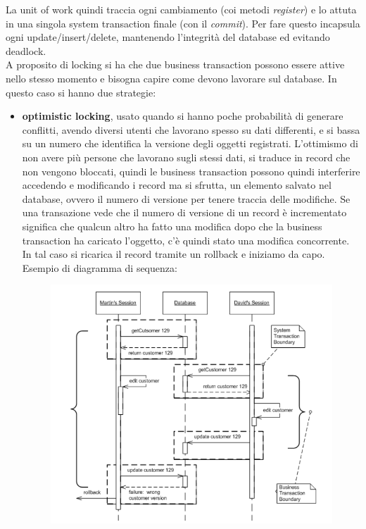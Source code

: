 La unit of work quindi traccia ogni cambiamento (coi metodi \textit{register}) e lo attuta in una singola system transaction finale (con il \textit{commit}). Per fare questo incapsula ogni update/insert/delete, mantenendo l'integrità del database ed evitando deadlock.\\ 
A proposito di locking si ha che due business transaction possono essere attive nello stesso momento e bisogna capire come devono lavorare sul database. In questo caso si hanno due strategie:
\begin{itemize}
    \item \textbf{optimistic locking}, usato quando si hanno poche probabilità di generare conflitti, avendo diversi utenti che lavorano spesso su dati differenti, e si bassa su un numero che identifica la versione degli oggetti registrati. L'ottimismo di non avere più persone che lavorano sugli stessi dati, si traduce in record che non vengono bloccati, quindi le business transaction possono quindi interferire accedendo e modificando i record ma si sfrutta, un elemento salvato nel database, ovvero il numero di versione per tenere traccia delle modifiche. Se una transazione vede che il numero di versione di un record è incrementato significa che qualcun altro ha fatto una modifica dopo che la business transaction ha caricato l'oggetto, c'è quindi stato una modifica concorrente. In  tal caso si ricarica il record tramite un rollback e iniziamo da capo.
    Esempio di diagramma di sequenza:
    \begin{figure}[H]
        \centering
        \includegraphics[scale = 0.5]{Imm/OptimisticSketch.png}

\end{figure}
\end{itemize}
